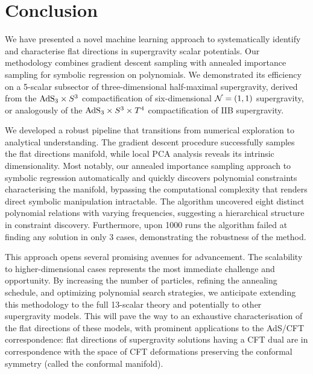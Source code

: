 \documentclass[11pt,a4paper]{article}
\begin{document}
\section{Conclusion} \label{sec:ccl}
We have presented a novel machine learning approach to systematically identify and characterise flat directions in supergravity scalar potentials. Our methodology combines gradient descent sampling with annealed importance sampling for symbolic regression on polynomials. We demonstrated its efficiency on a 5-scalar subsector of three-dimensional half-maximal supergravity, derived from the ${\rm AdS}_3 \times S^3$ compactification of six-dimensional ${\cal N}=(1,1)$ supergravity, or analogously of the ${\rm AdS}_3 \times S^3 \times T^4$ compactification of IIB supergravity.

We developed a robust pipeline that transitions from numerical exploration to analytical understanding. The gradient descent procedure successfully samples the flat directions manifold, while local PCA analysis reveals its intrinsic dimensionality. Most notably, our annealed importance sampling approach to symbolic regression automatically and quickly discovers polynomial constraints characterising the manifold, bypassing the computational complexity that renders direct symbolic manipulation intractable. The algorithm uncovered eight distinct polynomial relations with varying frequencies, suggesting a hierarchical structure in constraint discovery. Furthermore, upon 1000 runs the algorithm failed at finding any solution in only 3 cases, demonstrating the robustness of the method. 

This approach opens several promising avenues for advancement. The scalability to higher-dimensional cases represents the most immediate challenge and opportunity. By increasing the number of particles, refining the annealing schedule, and optimizing polynomial search strategies, we anticipate extending this methodology to the full 13-scalar theory and potentially to other supergravity models. This will pave the way to an exhaustive characterisation of the flat directions of these models, with prominent applications to the AdS/CFT correspondence: flat directions of supergravity solutions having a CFT dual are in correspondence with the space of CFT deformations preserving the conformal symmetry (called the conformal manifold). 

\end{document}
